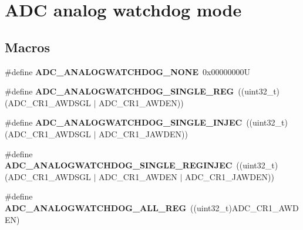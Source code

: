 \hypertarget{group___a_d_c__analog__watchdog__mode}{}\section{A\+DC analog watchdog mode}
\label{group___a_d_c__analog__watchdog__mode}
\subsection*{Macros}
\begin{DoxyCompactItemize}
\item 
\mbox{\label{group___a_d_c__analog__watchdog__mode_gad173f9dd01d4585c9b7c8c324de399c0}} 
\#define {\bfseries A\+D\+C\+\_\+\+A\+N\+A\+L\+O\+G\+W\+A\+T\+C\+H\+D\+O\+G\+\_\+\+N\+O\+NE}~0x00000000U
\item 
\mbox{\label{group___a_d_c__analog__watchdog__mode_gad4cf176e721fd2382fbc7937e352db67}} 
\#define {\bfseries A\+D\+C\+\_\+\+A\+N\+A\+L\+O\+G\+W\+A\+T\+C\+H\+D\+O\+G\+\_\+\+S\+I\+N\+G\+L\+E\+\_\+\+R\+EG}~((uint32\+\_\+t)(A\+D\+C\+\_\+\+C\+R1\+\_\+\+A\+W\+D\+S\+GL $\vert$ A\+D\+C\+\_\+\+C\+R1\+\_\+\+A\+W\+D\+EN))
\item 
\mbox{\label{group___a_d_c__analog__watchdog__mode_ga47d8850a833f799ceb433491a3d6659c}} 
\#define {\bfseries A\+D\+C\+\_\+\+A\+N\+A\+L\+O\+G\+W\+A\+T\+C\+H\+D\+O\+G\+\_\+\+S\+I\+N\+G\+L\+E\+\_\+\+I\+N\+J\+EC}~((uint32\+\_\+t)(A\+D\+C\+\_\+\+C\+R1\+\_\+\+A\+W\+D\+S\+GL $\vert$ A\+D\+C\+\_\+\+C\+R1\+\_\+\+J\+A\+W\+D\+EN))
\item 
\mbox{\label{group___a_d_c__analog__watchdog__mode_gaa0c246b49622fa85c7df6e11f583dffb}} 
\#define {\bfseries A\+D\+C\+\_\+\+A\+N\+A\+L\+O\+G\+W\+A\+T\+C\+H\+D\+O\+G\+\_\+\+S\+I\+N\+G\+L\+E\+\_\+\+R\+E\+G\+I\+N\+J\+EC}~((uint32\+\_\+t)(A\+D\+C\+\_\+\+C\+R1\+\_\+\+A\+W\+D\+S\+GL $\vert$ A\+D\+C\+\_\+\+C\+R1\+\_\+\+A\+W\+D\+EN $\vert$ A\+D\+C\+\_\+\+C\+R1\+\_\+\+J\+A\+W\+D\+EN))
\item 
\mbox{\label{group___a_d_c__analog__watchdog__mode_gad9d25140644089dd34084cb4dfa7ebd8}} 
\#define {\bfseries A\+D\+C\+\_\+\+A\+N\+A\+L\+O\+G\+W\+A\+T\+C\+H\+D\+O\+G\+\_\+\+A\+L\+L\+\_\+\+R\+EG}~((uint32\+\_\+t)A\+D\+C\+\_\+\+C\+R1\+\_\+\+A\+W\+D\+EN)

\end{DoxyCompactItemize}
